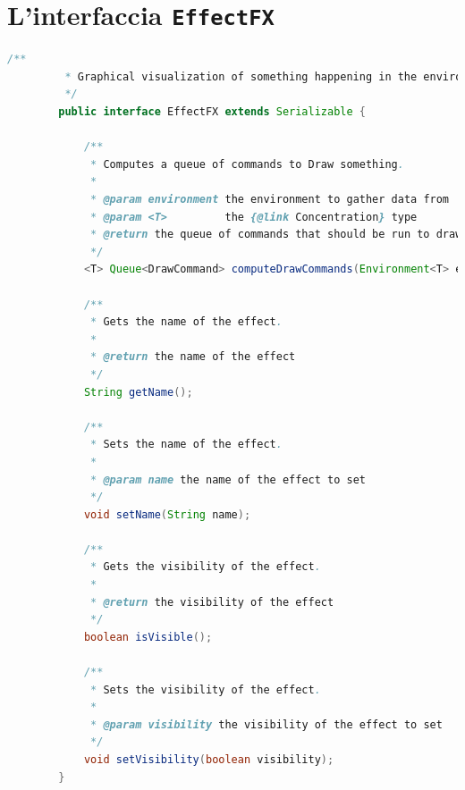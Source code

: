 \chapter{L'interfaccia \texttt{EffectFX}}\label{appendix:effectfx}
    \begin{lstlisting}[language=Java]
        /**
         * Graphical visualization of something happening in the environment.
         */
        public interface EffectFX extends Serializable {

            /**
             * Computes a queue of commands to Draw something.
             *
             * @param environment the environment to gather data from
             * @param <T>         the {@link Concentration} type
             * @return the queue of commands that should be run to draw the effect
             */
            <T> Queue<DrawCommand> computeDrawCommands(Environment<T> environment);

            /**
             * Gets the name of the effect.
             *
             * @return the name of the effect
             */
            String getName();

            /**
             * Sets the name of the effect.
             *
             * @param name the name of the effect to set
             */
            void setName(String name);

            /**
             * Gets the visibility of the effect.
             *
             * @return the visibility of the effect
             */
            boolean isVisible();

            /**
             * Sets the visibility of the effect.
             *
             * @param visibility the visibility of the effect to set
             */
            void setVisibility(boolean visibility);
        }
    \end{lstlisting}

